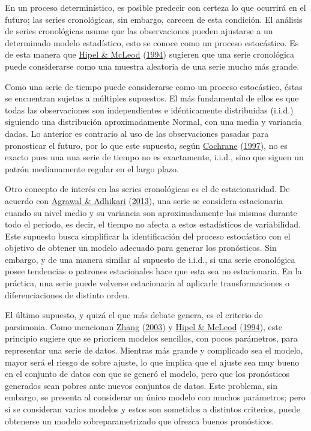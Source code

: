 \documentclass[
]{article}
\begin{document}
En un proceso determinístico, es posible predecir con certeza lo que
ocurrirá en el futuro; las series cronológicas, sin embargo, carecen de
esta condición. El análisis de series cronológicas asume que las
observaciones pueden ajustarse a un determinado modelo estadístico, esto
se conoce como un proceso estocástico. Es de esta manera que
\protect\hyperlink{ref-Hipel}{Hipel \& McLeod}
(\protect\hyperlink{ref-Hipel}{1994}) sugieren que una serie cronológica
puede considerarse como una muestra aleatoria de una serie mucho más
grande.

Como una serie de tiempo puede considerarse como un proceso estocástico,
éstas se encuentran sujetas a múltiples supuestos. El más fundamental de
ellos es que todas las observaciones son independientes e idénticamente
distribuidas (i.i.d.) siguiendo una distribución aproximadamente Normal,
con una media y variancia dadas. Lo anterior es contrario al uso de las
observaciones pasadas para pronosticar el futuro, por lo que este
supuesto, según \protect\hyperlink{ref-Cochrane}{Cochrane}
(\protect\hyperlink{ref-Cochrane}{1997}), no es exacto pues una una
serie de tiempo no es exactamente, i.i.d., sino que siguen un patrón
medianamente regular en el largo plazo.

Otro concepto de interés en las series cronológicas es el de
estacionaridad. De acuerdo con
\protect\hyperlink{ref-stationary_def}{Agrawal \& Adhikari}
(\protect\hyperlink{ref-stationary_def}{2013}), una serie se considera
estacionaria cuando su nivel medio y su variancia son aproximadamente
las mismas durante todo el periodo, es decir, el tiempo no afecta a
estos estadísticos de variabilidad. Este supuesto busca simplificar la
identificación del proceso estocástico con el objetivo de obtener un
modelo adecuado para generar los pronósticos. Sin embargo, y de una
manera similar al supuesto de i.i.d., si una serie cronológica posee
tendencias o patrones estacionales hace que esta sea no estacionaria. En
la práctica, una serie puede volverse estacionaria al aplicarle
transformaciones o diferenciaciones de distinto orden.

El último supuesto, y quizá el que más debate genera, es el criterio de
parsimonia. Como mencionan \protect\hyperlink{ref-Zhang}{Zhang}
(\protect\hyperlink{ref-Zhang}{2003}) y
\protect\hyperlink{ref-Hipel}{Hipel \& McLeod}
(\protect\hyperlink{ref-Hipel}{1994}), este principio sugiere que se
prioricen modelos sencillos, con pocos parámetros, para representar una
serie de datos. Mientras más grande y complicado sea el modelo, mayor
será el riesgo de sobre ajuste, lo que implica que el ajuste sea muy
bueno en el conjunto de datos con que se generó el modelo, pero que los
pronósticos generados sean pobres ante nuevos conjuntos de datos. Este
problema, sin embargo, se presenta al considerar un único modelo con
muchos parámetros; pero si se consideran varios modelos y estos son
sometidos a distintos criterios, puede obtenerse un modelo
sobreparametrizado que ofrezca buenos pronósticos.
\end{document}
